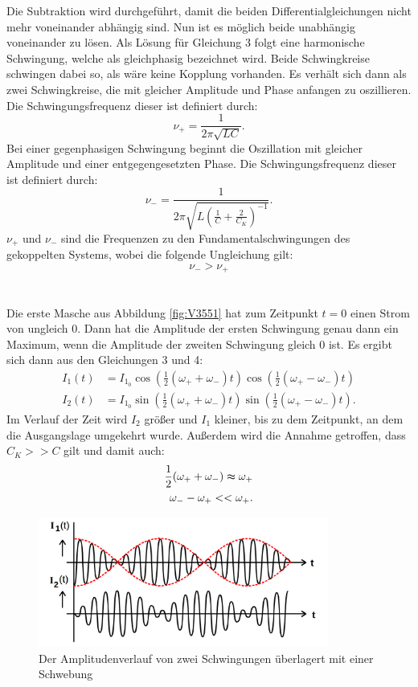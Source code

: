 \documentclass[
  bibliography=totoc,     %
  captions=tableheading,  %
  titlepage=firstiscover, %
]{scrartcl}
\begin{document}
Die Subtraktion wird durchgeführt, damit die beiden Differentialgleichungen nicht
mehr voneinander abhängig sind. Nun ist es möglich beide unabhängig voneinander
zu lösen. Als Lösung für Gleichung 3 folgt eine harmonische Schwingung, welche
als gleichphasig bezeichnet wird. Beide Schwingkreise schwingen dabei so, als
wäre keine Kopplung vorhanden. Es verhält sich dann als zwei Schwingkreise, die
mit gleicher Amplitude und Phase anfangen zu oszillieren. Die
Schwingungsfrequenz dieser ist definiert durch:
\begin{equation}
  \nu_+=\frac{1}{2\pi\sqrt{LC}}.
\end{equation}
Bei einer gegenphasigen Schwingung beginnt die Oszillation mit gleicher
Amplitude und einer entgegengesetzten Phase. Die Schwingungsfrequenz dieser
ist definiert durch:
\begin{equation}
  \nu_-=\frac{1}{2\pi\sqrt{L(\frac{1}{C}+\frac{2}{C_K})^{-1}}}.
\end{equation}
$\nu_+$ und $\nu_-$ sind die Frequenzen zu den Fundamentalschwingungen des
gekoppelten Systems, wobei die folgende Ungleichung gilt:
\begin{equation}
  \nu_->\nu_+
\end{equation} \\
\\
Die erste Masche aus Abbildung \ref{fig:V3551} hat zum Zeitpunkt $t=0$ einen
Strom von ungleich 0. Dann hat die Amplitude der ersten Schwingung genau dann
ein Maximum, wenn die Amplitude der zweiten Schwingung gleich 0 ist. Es
ergibt sich dann aus den Gleichungen 3 und 4:
\begin{align}
  I_1(t) &=I_{1_0}\cos(\frac{1}{2}(\omega_++\omega_-)t)\cos(\frac{1}{2}(\omega_+-\omega_-)t) \\
  I_2(t) &=I_{1_0}\sin(\frac{1}{2}(\omega_++\omega_-)t)\sin(\frac{1}{2}(\omega_+-\omega_-)t).
\end{align}
Im Verlauf der Zeit wird $I_2$ größer und $I_1$ kleiner, bis zu dem Zeitpunkt, an
dem die Ausgangslage umgekehrt wurde. Außerdem wird die Annahme getroffen, dass
$C_K>>C$ gilt und damit auch:
\begin{align}
  \frac{1}{2}(\omega_++\omega_-)\thickapprox\omega_+ \\
  \omega_--\omega_+<<\omega_+.
\end{align}
\begin{figure}[htb]
  \centering
  \includegraphics[width=0.85\textwidth]{V3552.png}
  \caption{Der Amplitudenverlauf von zwei Schwingungen überlagert mit einer Schwebung}
  \label{fig:V3552}
\end{figure}
\end{document}

